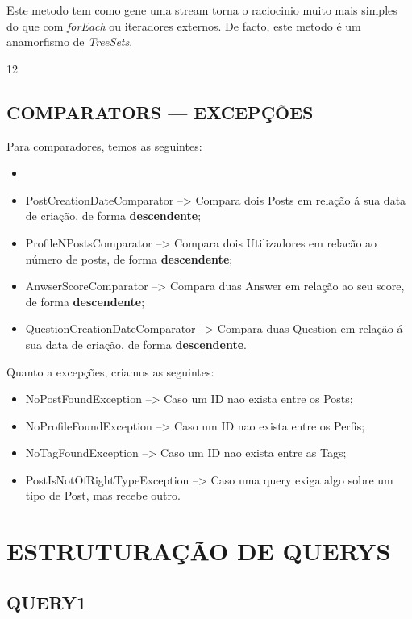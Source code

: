\documentclass[letterpaper, 10 pt, conference]{IEEEtran} %
\begin{document}
Este metodo tem como gene uma stream torna o raciocinio muito mais simples do que com \textit{forEach} ou iteradores externos.
De facto, este metodo é um anamorfismo de \textit{TreeSets}.

12


\subsection{COMPARATORS --- EXCEPÇÕES}

Para comparadores, temos as seguintes:
\begin{itemize}
    \item \item PostCreationDateComparator --> Compara dois Posts em relação á sua data de criação, de forma \textbf{descendente};
    \item ProfileNPostsComparator --> Compara dois Utilizadores em relacão ao número de posts, de forma \textbf{descendente};
    \item AnwserScoreComparator --> Compara duas Answer em relação ao seu score, de forma \textbf{descendente};
    \item QuestionCreationDateComparator --> Compara duas Question em relação á sua data de criação, de forma \textbf{descendente}.
\end{itemize}


Quanto a excepções, criamos as seguintes:
\begin{itemize}
     \item NoPostFoundException --> Caso um ID nao exista entre os Posts;
     \item NoProfileFoundException --> Caso um ID nao exista entre os Perfis;
     \item NoTagFoundException --> Caso um ID nao exista entre as Tags;
     \item PostIsNotOfRightTypeException --> Caso uma query exiga algo sobre um tipo de Post, mas recebe outro.
\end{itemize}


\section{ESTRUTURAÇÃO DE QUERYS}

\subsection{QUERY1}
\end{document}

